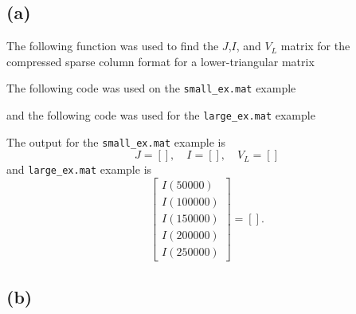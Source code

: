 \documentclass[11pt]{article}
\theoremstyle{definition}
\theoremstyle{remark}
\newcommand{\newpart}{\vspace{-0.5\baselineskip}\hrulefill\vspace{-1.3\baselineskip}}
\theoremstyle{plain}
\begin{document}
\subsection*{(a)}
The following function was used to find the $J$,$I$, and $V_L$ matrix for the compressed sparse column format for a lower-triangular matrix

The following code was used on the \texttt{small\_ex.mat} example

and the following code was used for the \texttt{large\_ex.mat} example

The output for the \texttt{small\_ex.mat} example is
\begin{equation*}
  J=\left[\right],\quad I=\left[\right],\quad V_L=\left[\right]
\end{equation*}
and \texttt{large\_ex.mat} example is
\begin{equation*}
  \left[
    \begin{array}{r}
      I(50000)\\
      I(100000)\\
      I(150000)\\
      I(200000)\\
      I(250000)
    \end{array}
  \right]=\left[\right].
\end{equation*}

\newpage
\newpart
\subsection*{(b)}
\end{document}
